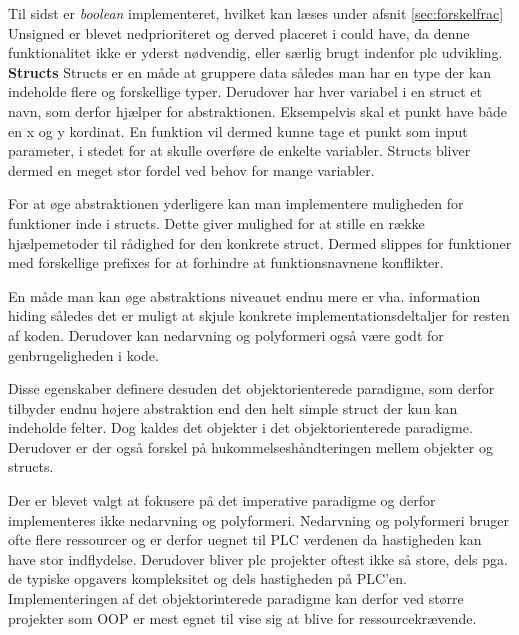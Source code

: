 
Til sidst er \textit{boolean} implementeret, hvilket kan læses under afsnit \ref{sec:forskelfrac}\\
Unsigned er blevet nedprioriteret og derved placeret i could have, da denne funktionalitet ikke er yderst nødvendig, eller særlig brugt indenfor \gls{plc} udvikling.\\

\noindent\textbf{Structs}
Structs er en måde at gruppere data således man har en type der kan indeholde flere og forskellige typer. Derudover har hver variabel i en struct et navn, som derfor hjælper for abstraktionen. Eksempelvis skal et punkt have både en x og y kordinat. En funktion vil dermed kunne tage et punkt som input parameter, i stedet for at skulle overføre de enkelte variabler. Structs bliver dermed en meget stor fordel ved behov for mange variabler.

For at øge abstraktionen yderligere kan man implementere muligheden for funktioner inde i structs. Dette giver mulighed for at stille en række hjælpemetoder til rådighed for den konkrete struct. Dermed slippes for funktioner med forskellige prefixes for at forhindre at funktionsnavnene konflikter.

En måde man kan øge abstraktions niveauet endnu mere er vha. information hiding således det er muligt at skjule konkrete implementationsdeltaljer for resten af koden. Derudover kan nedarvning og polyformeri også være godt for genbrugeligheden i kode.

Disse egenskaber definere desuden det objektorienterede paradigme, som derfor tilbyder endnu højere abstraktion end den helt simple struct der kun kan indeholde felter. Dog kaldes det objekter i det objektorienterede paradigme. Derudover er der også forskel på hukommelseshåndteringen mellem objekter og structs.

Der er blevet valgt at fokusere på det imperative paradigme og derfor implementeres ikke nedarvning og polyformeri. Nedarvning og polyformeri bruger ofte flere ressourcer og er derfor uegnet til PLC verdenen da hastigheden kan have stor indflydelse. Derudover bliver \gls{plc} projekter oftest ikke så store, dels pga. de typiske opgavers kompleksitet og dels hastigheden på PLC'en. Implementeringen af det objektorinterede paradigme kan derfor ved større projekter som OOP er mest egnet til vise sig at blive for ressourcekrævende.

